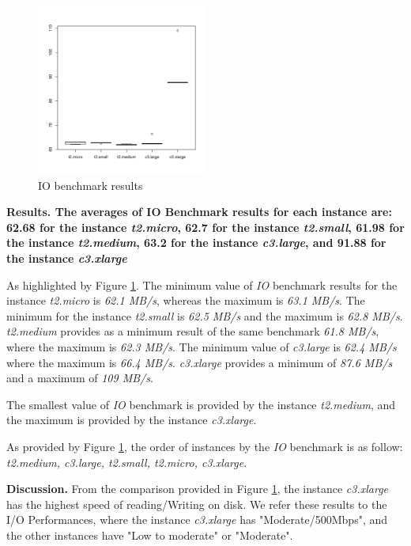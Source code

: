 \documentclass[10pt, conference]{IEEEtran}
\begin{document}
\begin{figure}
\includegraphics[width=0.5\textwidth]{plots/dd.pdf}
\caption{IO benchmark results}
\label{fig:ddResult}
\end{figure}

\textbf{Results. The averages of IO Benchmark results for each instance are: 62.68 for the instance \textit{t2.micro}, 62.7 for the instance \textit{t2.small}, 61.98 for the instance \textit{t2.medium}, 63.2 for the instance \textit{c3.large}, and 91.88 for the instance \textit{c3.xlarge}}

As highlighted by Figure \ref{fig:ddResult}. The minimum value of \textit{IO} benchmark results for the instance \textit{t2.micro} is \textit{62.1 MB/s}, whereas the maximum is \textit{63.1 MB/s}. The minimum for the instance \textit{t2.small} is \textit{62.5 MB/s} and the maximum is \textit{62.8 MB/s}. \textit{t2.medium} provides as a minimum result of the same benchmark \textit{61.8 MB/s}, where the maximum is \textit{62.3 MB/s}. The minimum value of \textit{c3.large} is \textit{62.4 MB/s} where the maximum is \textit{66.4 MB/s}. \textit{c3.xlarge} provides a minimum of \textit{87.6 MB/s} and a maximum of \textit{109 MB/s}.

The smallest value of \textit{IO} benchmark is provided by the instance \textit{t2.medium}, and the maximum is provided by the instance \textit{c3.xlarge}.

As provided by Figure \ref{fig:ddResult}, the order of instances by the \textit{IO} benchmark is as follow: \textit{ t2.medium, c3.large, t2.small, t2.micro, c3.xlarge}.


\textbf{Discussion.} From the comparison provided in Figure \ref{fig:ddResult}, the instance \textit{c3.xlarge} has the highest speed of reading/Writing on disk. We refer these results to the I/O Performances, where the instance \textit{c3.xlarge} has "Moderate/500Mbps", and the other instances have "Low to moderate" or "Moderate".
\end{document}
